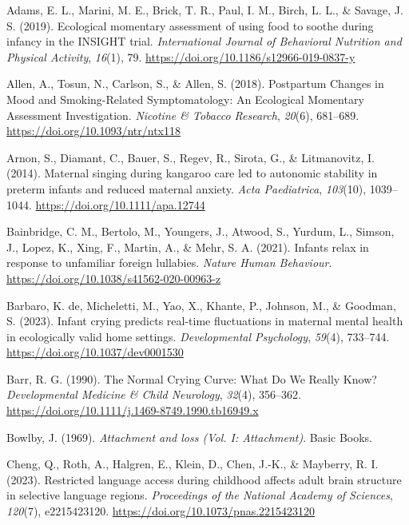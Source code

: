 \documentclass[
]{article}
\newlength{\cslhangindent}
\newenvironment{CSLReferences}[2] %
 {\begin{list}{}{%
  \setlength{\itemindent}{0pt}
  \setlength{\leftmargin}{0pt}
  \setlength{\parsep}{0pt}
  \ifodd #1
   \setlength{\leftmargin}{\cslhangindent}
   \setlength{\itemindent}{-1\cslhangindent}
  \fi
  \setlength{\itemsep}{#2\baselineskip}}}
 {\end{list}}
\begin{document}
\label{refs}
\begin{CSLReferences}{1}{0}
Adams, E. L., Marini, M. E., Brick, T. R., Paul, I. M., Birch, L. L., \&
Savage, J. S. (2019). Ecological momentary assessment of using food to
soothe during infancy in the {INSIGHT} trial. \emph{International
Journal of Behavioral Nutrition and Physical Activity}, \emph{16}(1),
79. \url{https://doi.org/10.1186/s12966-019-0837-y}

Allen, A., Tosun, N., Carlson, S., \& Allen, S. (2018). Postpartum
{Changes} in {Mood} and {Smoking}-{Related} {Symptomatology}: {An}
{Ecological} {Momentary} {Assessment} {Investigation}. \emph{Nicotine \&
Tobacco Research}, \emph{20}(6), 681--689.
\url{https://doi.org/10.1093/ntr/ntx118}

Arnon, S., Diamant, C., Bauer, S., Regev, R., Sirota, G., \&
Litmanovitz, I. (2014). Maternal singing during kangaroo care led to
autonomic stability in preterm infants and reduced maternal anxiety.
\emph{Acta Paediatrica}, \emph{103}(10), 1039--1044.
\url{https://doi.org/10.1111/apa.12744}

Bainbridge, C. M., Bertolo, M., Youngers, J., Atwood, S., Yurdum, L.,
Simson, J., Lopez, K., Xing, F., Martin, A., \& Mehr, S. A. (2021).
Infants relax in response to unfamiliar foreign lullabies. \emph{Nature
Human Behaviour}. \url{https://doi.org/10.1038/s41562-020-00963-z}

Barbaro, K. de, Micheletti, M., Yao, X., Khante, P., Johnson, M., \&
Goodman, S. (2023). Infant crying predicts real-time fluctuations in
maternal mental health in ecologically valid home settings.
\emph{Developmental Psychology}, \emph{59}(4), 733--744.
\url{https://doi.org/10.1037/dev0001530}

Barr, R. G. (1990). The {Normal Crying Curve}: {What Do We Really Know}?
\emph{Developmental Medicine \& Child Neurology}, \emph{32}(4),
356--362. \url{https://doi.org/10.1111/j.1469-8749.1990.tb16949.x}

Bowlby, J. (1969). \emph{Attachment and loss ({Vol}. {I}:
{Attachment})}. Basic Books.

Cheng, Q., Roth, A., Halgren, E., Klein, D., Chen, J.-K., \& Mayberry,
R. I. (2023). Restricted language access during childhood affects adult
brain structure in selective language regions. \emph{Proceedings of the
National Academy of Sciences}, \emph{120}(7), e2215423120.
\url{https://doi.org/10.1073/pnas.2215423120}


\end{CSLReferences}
\end{document}
